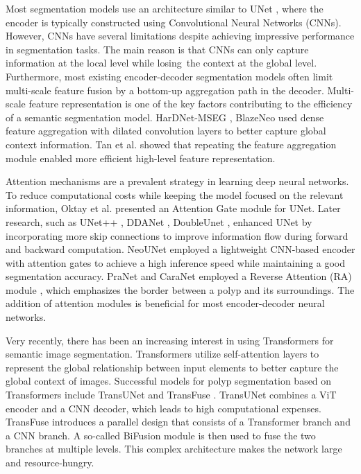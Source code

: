 \documentclass{article}
\begin{document}
Most segmentation models use an architecture similar to UNet \cite{unet}, where the encoder is typically constructed using Convolutional Neural Networks (CNNs). However, CNNs have several limitations despite achieving impressive performance in segmentation tasks. The main reason is that CNNs can only capture information at the local level while losing the context at the global level.
Furthermore, most existing encoder-decoder segmentation models often limit multi-scale feature fusion by a bottom-up aggregation path in the decoder. Multi-scale feature representation is one of the key factors contributing to the efficiency of a semantic segmentation model. HarDNet-MSEG \cite{hardnet_mseg}, BlazeNeo \cite{an2022blazeneo} used dense feature aggregation with dilated convolution layers to better capture global context information. Tan et al. \cite{tan2020efficientdet} showed that repeating the feature aggregation module enabled more efficient high-level feature representation. 

Attention mechanisms are a prevalent strategy in learning deep neural networks. To reduce computational costs while keeping the model focused on the relevant information, Oktay et al. \cite{oktay2018attention} presented an Attention Gate module for UNet. Later research, such as UNet++ \cite{unet++}, DDANet \cite{ddanet}, DoubleUnet \cite{doubleunet}, enhanced UNet by incorporating more skip connections to improve information flow during forward and backward computation. NeoUNet \cite{ngoc2021neounet} employed a lightweight CNN-based encoder with attention gates to achieve a high inference speed while maintaining a good segmentation accuracy. PraNet \cite{pranet} and CaraNet \cite{caranet} employed a Reverse Attention (RA) module \cite{ra}, which emphasizes the border between a polyp and its surroundings. The addition of attention modules is beneficial for most encoder-decoder neural networks.

Very recently, there has been an increasing interest in using Transformers \cite{khan2022transformers} for semantic image segmentation. Transformers utilize self-attention layers to represent the global relationship between input elements to better capture the global context of images. Successful models for polyp segmentation based on Transformers include TransUNet \cite{transunet} and TransFuse \cite{transfuse}. TransUNet combines a ViT encoder and a CNN decoder, which leads to high computational expenses. TransFuse introduces a parallel design that consists of a Transformer branch and a CNN branch. A so-called BiFusion module is then used to fuse the two branches at multiple levels. This complex architecture makes the network large and resource-hungry. 
\end{document}
